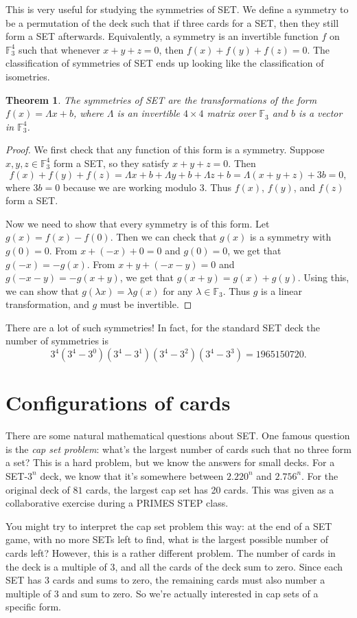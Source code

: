 \documentclass{article}
\newtheorem{thm}{Theorem}
\theoremstyle{definition}
\theoremstyle{remark}
\begin{document}
This is very useful for studying the symmetries of SET. We define a symmetry to be a permutation of the deck such that if three cards for a SET, then they still form a SET afterwards. Equivalently, a symmetry is an invertible function $f$ on $\mathbb F_3^4$ such that whenever $x+y+z=0$, then $f(x)+f(y)+f(z)=0$. The classification of symmetries of SET ends up looking like the classification of isometries.

\begin{thm}
    The symmetries of SET are the transformations of the form $f(x)=\Lambda x+b$, where $\Lambda$ is an invertible $4\times 4$ matrix over $\mathbb F_3$ and $b$ is a vector in $\mathbb F_3^4$.
\end{thm}
\begin{proof}
    We first check that any function of this form is a symmetry. Suppose $x,y,z\in\mathbb F_3^4$ form a SET, so they satisfy $x+y+z=0$. Then
    \[f(x)+f(y)+f(z)=\Lambda x+b+\Lambda y+b+\Lambda z+b=\Lambda(x+y+z)+3b=0,\]
    where $3b=0$ because we are working modulo 3. Thus $f(x)$, $f(y)$, and $f(z)$ form a SET.

    Now we need to show that every symmetry is of this form. Let $g(x)=f(x)-f(0)$. Then we can check that $g(x)$ is a symmetry with $g(0)=0$. From $x+(-x)+0=0$ and $g(0)=0$, we get that $g(-x)=-g(x)$. From $x+y+(-x-y)=0$ and $g(-x-y)=-g(x+y)$, we get that $g(x+y)=g(x)+g(y)$. Using this, we can show that $g(\lambda x)=\lambda g(x)$ for any $\lambda\in\mathbb F_3$. Thus $g$ is a linear transformation, and $g$ must be invertible.
\end{proof}

There are a lot of such symmetries! In fact, for the standard SET deck the number of symmetries is
\[3^4(3^4-3^0)(3^4-3^1)(3^4-3^2)(3^4-3^3)=1965150720.\]

\section{Configurations of cards}
There are some natural mathematical questions about SET. One famous question is the \emph{cap set problem}: what's the largest number of cards such that no three form a set? This is a hard problem, but we know the answers for small decks. For a SET-$3^n$ deck, we know that it's somewhere between $2.220^n$ and $2.756^n$. For the original deck of $81$ cards, the largest cap set has 20 cards. This was given as a collaborative exercise during a PRIMES STEP class.

You might try to interpret the cap set problem this way: at the end of a SET game, with no more SETs left to find, what is the largest possible number of cards left? However, this is a rather different problem. The number of cards in the deck is a multiple of 3, and all the cards of the deck sum to zero. Since each SET has 3 cards and sums to zero, the remaining cards must also number a multiple of 3 and sum to zero. So we're actually interested in cap sets of a specific form.
\end{document}
